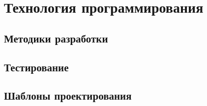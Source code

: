 \chapter{Технология программирования}

\section{Методики разработки}

\section{Тестирование}

\section{Шаблоны проектирования}
